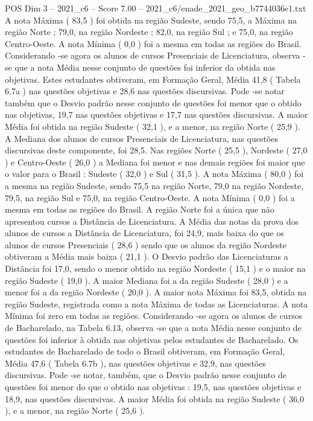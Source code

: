 \begin{textsample}{POS Dim 3 – 2021\_c6 – Score 7.00 – 2021\_c6/enade\_2021\_geo\_b7744036e1.txt}
A nota Máxima ( 83,5 ) foi obtida na região Sudeste, sendo 75,5, a Máxima na região Norte ; 79,0, na região Nordeste ; 82,0, na região Sul ; e 75,0, na região Centro-Oeste.
A nota Mínima ( 0,0 ) foi a mesma em todas as regiões do Brasil.
Considerando -se agora os alunos de cursos Presenciais de Licenciatura, observa -se que a nota Média nesse conjunto de questões foi inferior da obtida nas objetivas.
Estes estudantes obtiveram, em Formação Geral, Média 41,8 ( Tabela 6.7a ) nas questões objetivas e 28,6 nas questões discursivas.
Pode -se notar também que o Desvio padrão nesse conjunto de questões foi menor que o obtido nas objetivas, 19,7 nas questões objetivas e 17,7 nas questões discursivas.
A maior Média foi obtida na região Sudeste ( 32,1 ), e a menor, na região Norte ( 25,9 ).
A Mediana dos alunos de cursos Presenciais de Licenciatura, nas questões discursivas deste componente, foi 28,5.
Nas regiões Norte ( 25,5 ), Nordeste ( 27,0 ) e Centro-Oeste ( 26,0 ) a Mediana foi menor e nas demais regiões foi maior que o valor para o Brasil : Sudeste ( 32,0 ) e Sul ( 31,5 ).
A nota Máxima ( 80,0 ) foi a mesma na região Sudeste, sendo 75,5 na região Norte, 79,0 na região Nordeste, 79,5, na região Sul e 75,0, na região Centro-Oeste.
A nota Mínima ( 0,0 ) foi a mesma em todas as regiões do Brasil.
A região Norte foi a única que não apresentou cursos a Distância de Licenciatura.
A Média das notas da prova dos alunos de cursos a Distância de Licenciatura, foi 24,9, mais baixa do que os alunos de cursos Presenciais ( 28,6 ) sendo que os alunos da região Nordeste obtiveram a Média mais baixa ( 21,1 ).
O Desvio padrão das Licenciaturas a Distância foi 17,0, sendo o menor obtido na região Nordeste ( 15,1 ) e o maior na região Sudeste ( 19,0 ).
A maior Mediana foi a da região Sudeste ( 28,0 ) e a menor foi a da região Nordeste ( 20,0 ).
A maior nota Máxima foi 83,5, obtida na região Sudeste, registrada como a nota Máxima de todas as Licenciaturas.
A nota Mínima foi zero em todas as regiões.
Considerando -se agora os alunos de cursos de Bacharelado, na Tabela 6.13, observa -se que a nota Média nesse conjunto de questões foi inferior à obtida nas objetivas pelos estudantes de Bacharelado.
Os estudantes de Bacharelado de todo o Brasil obtiveram, em Formação Geral, Média 47,6 ( Tabela 6.7b ), nas questões objetivas e 32,9, nas questões discursivas.
Pode -se notar, também, que o Desvio padrão nesse conjunto de questões foi menor do que o obtido nas objetivas : 19,5, nas questões objetivas e 18,9, nas questões discursivas.
A maior Média foi obtida na região Sudeste ( 36,0 ), e a menor, na região Norte ( 25,6 ).

\end{textsample}
